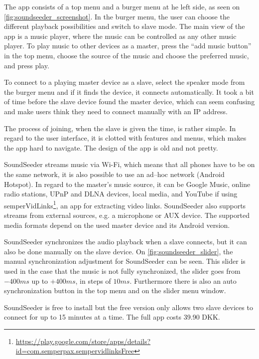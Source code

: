 The app consists of a top menu and a burger menu at he left side, as seen on \cref{fig:soundseeder_screenshot}.
In the burger menu, the user can choose the different playback possibilities and switch to slave mode.
The main view of the app is a music player, where the music can be controlled as any other music player. 
To play music to other devices as a master, press the ``add music button'' in the top menu,
choose the source of the music and choose the preferred music, and press play. 

To connect to a playing master device as a slave, select the speaker mode from the burger menu and if it finds the device, it connects automatically.
It took a bit of time before the slave device found the master device, which can seem confusing and make users think they need to connect manually with an IP address. 

The process of joining, when the slave is given the time, is rather simple.
In regard to the user interface, it is clotted with features and menus, which makes the app hard to navigate.
The design of the app is old and not pretty.

SoundSeeder streams music via Wi-Fi, 
which means that all phones have to be on the same network\cite{soundseether_faq}, it is also possible to use an ad--hoc network (Android Hotspot).
In regard to the master's music source, it can be Google Music, online radio stations, UPnP and DLNA devices, local media, and YouTube if using semperVidLinks\footnote{\url{https://play.google.com/store/apps/details?id=com.semperpax.sempervidlinksFree}}, an app for extracting video links.
SoundSeeder also supports streams from external sources, e.g. a microphone or AUX device. 
The supported media formats depend on the used master device and its Android version.\cite{soundseether_faq}

SoundSeeder synchronizes the audio playback when a slave connects, but it can also be done manually on the slave device. 
On \cref{fig:soundseeder_slider}, the manual synchronization adjustment for SoundSeeder can be seen.
This slider is used in the case that the music is not fully synchronized, the slider goes from $-400 ms$ up to $+400 ms$, in steps of $10 ms$.
Furthermore there is also an auto synchronization button in the top menu and on the slider menu window. 

SoundSeeder is free to install but the free version only allows two slave devices to connect for up to 15 minutes at a time.
The full app costs 39.90 DKK. 

